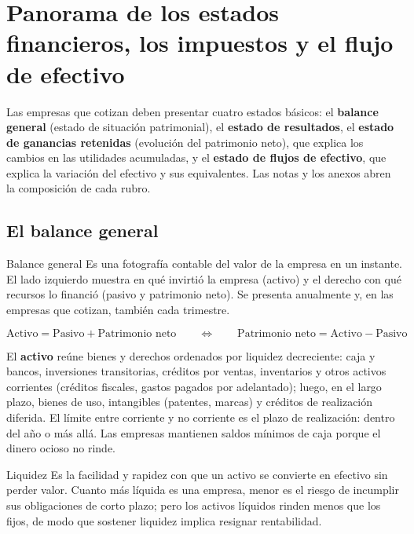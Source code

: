 \section{Panorama de los estados financieros, los impuestos y el flujo de efectivo}\label{sec:u2-eeff}

Las empresas que cotizan deben presentar cuatro estados básicos: el \textbf{balance general} (estado de situación patrimonial), el \textbf{estado de resultados}, el \textbf{estado de ganancias retenidas} (evolución del patrimonio neto), que explica los cambios en las utilidades acumuladas, y el \textbf{estado de flujos de efectivo}, que explica la variación del efectivo y sus equivalentes. Las notas y los anexos abren la composición de cada rubro.

\subsection{El balance general}

\begin{definicion}{Balance general}
Es una fotografía contable del valor de la empresa en un instante. El lado izquierdo muestra en qué invirtió la empresa (activo) y el derecho con qué recursos lo financió (pasivo y patrimonio neto). Se presenta anualmente y, en las empresas que cotizan, también cada trimestre.
\end{definicion}

\begin{formulaBox}
\[
\text{Activo} = \text{Pasivo} + \text{Patrimonio neto}
\qquad\Longleftrightarrow\qquad
\text{Patrimonio neto} = \text{Activo} - \text{Pasivo}
\]
\end{formulaBox}

El \textbf{activo} reúne bienes y derechos ordenados por liquidez decreciente: caja y bancos, inversiones transitorias, créditos por ventas, inventarios y otros activos corrientes (créditos fiscales, gastos pagados por adelantado); luego, en el largo plazo, bienes de uso, intangibles (patentes, marcas) y créditos de realización diferida. El límite entre corriente y no corriente es el plazo de realización: dentro del año o más allá. Las empresas mantienen saldos mínimos de caja porque el dinero ocioso no rinde.

\begin{definicion}{Liquidez}
Es la facilidad y rapidez con que un activo se convierte en efectivo sin perder valor. Cuanto más líquida es una empresa, menor es el riesgo de incumplir sus obligaciones de corto plazo; pero los activos líquidos rinden menos que los fijos, de modo que sostener liquidez implica resignar rentabilidad.
\end{definicion}

